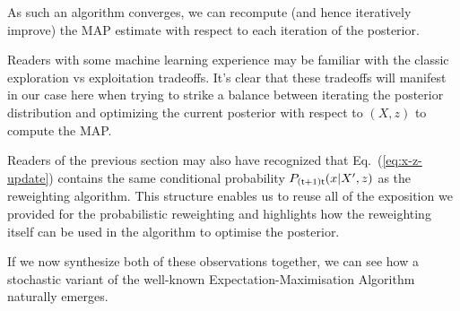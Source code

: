 As such an algorithm converges, we can recompute (and hence iteratively improve) the MAP estimate with respect to each iteration of the posterior.

Readers with some machine learning experience may be familiar with the classic exploration vs exploitation tradeoffs. It's clear that these tradeoffs will manifest in our case here when trying to strike a balance between iterating the posterior distribution and optimizing the current posterior with respect to $(X,z)$ to compute the MAP. 

Readers of the previous section may also have recognized that Eq.~(\ref{eq:x-z-update}) contains the same conditional probability $P_{({\sf t}+1){\sf t}}(x\vert X',z)$ as the reweighting algorithm. This structure enables us to reuse all of the exposition we provided for the probabilistic reweighting and highlights how the reweighting itself can be used in the algorithm to optimise the posterior.   

If we now synthesize both of these observations together, we can see how a stochastic variant of the well-known Expectation-Maximisation Algorithm~\cite{hartley1958maximum, dempster1977maximum, murphy2012machine} naturally emerges.



